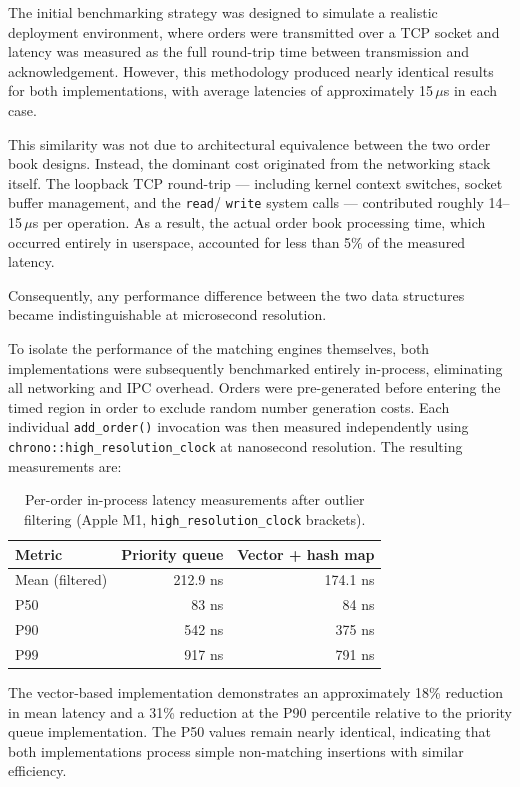 \documentclass[11pt,a4paper]{article}
\begin{document}
The initial benchmarking strategy was designed to simulate a realistic
deployment environment, where orders were transmitted over a TCP socket and
latency was measured as the full round-trip time between transmission and
acknowledgement. However, this methodology produced nearly identical
results for both implementations, with average latencies of approximately
15\,$\mu$s in each case.

This similarity was not due to architectural equivalence between the two
order book designs. Instead, the dominant cost originated from the
networking stack itself. The loopback TCP round-trip --- including kernel
context switches, socket buffer management, and the \texttt{read}/
\texttt{write} system calls --- contributed roughly 14--15\,$\mu$s per
operation. As a result, the actual order book processing time, which
occurred entirely in userspace, accounted for less than 5\% of the measured
latency.

Consequently, any performance difference between the two data structures
became indistinguishable at microsecond resolution.

To isolate the performance of the matching engines themselves, both
implementations were subsequently benchmarked entirely in-process,
eliminating all networking and IPC overhead. Orders were pre-generated
before entering the timed region in order to exclude random number
generation costs. Each individual \texttt{add\_order()} invocation was then
measured independently using \texttt{chrono::high\_resolution\_clock} at
nanosecond resolution. The resulting measurements are:

\begin{table}[h]
\centering
\begin{tabular}{lrr}
\toprule
Metric & Priority queue & Vector + hash map \\
\midrule
Mean (filtered) & 212.9 ns & 174.1 ns \\
P50             & 83 ns    & 84 ns    \\
P90             & 542 ns   & 375 ns   \\
P99             & 917 ns   & 791 ns   \\
\bottomrule
\end{tabular}
\caption{Per-order in-process latency measurements after outlier filtering
(Apple M1, \texttt{high\_resolution\_clock} brackets).}
\label{tab:phase12}
\end{table}

The vector-based implementation demonstrates an approximately 18\% reduction
in mean latency and a 31\% reduction at the P90 percentile relative to the
priority queue implementation. The P50 values remain nearly identical,
indicating that both implementations process simple non-matching insertions
with similar efficiency.
\end{document}
